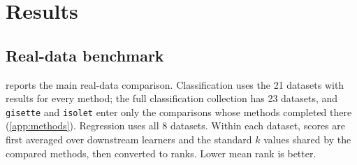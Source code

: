 \section{Results}
\label{sec:results}

\subsection{Real-data benchmark}
\label{sec:experiments-real}

 reports the main real-data comparison.
Classification uses the 21 datasets with results for every method; the full
classification collection has 23 datasets, and \nolinkurl{gisette} and
\nolinkurl{isolet} enter only the comparisons whose methods completed there
(\cref{app:methods}). Regression uses all 8 datasets. Within each dataset,
scores are first averaged over downstream learners and the standard $k$ values
shared by the compared methods, then converted to ranks. Lower mean rank is
better.

